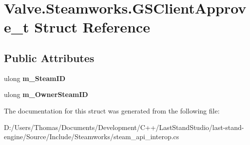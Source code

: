 \hypertarget{structValve_1_1Steamworks_1_1GSClientApprove__t}{}\section{Valve.\+Steamworks.\+G\+S\+Client\+Approve\+\_\+t Struct Reference}
\label{structValve_1_1Steamworks_1_1GSClientApprove__t}
\subsection*{Public Attributes}
\begin{DoxyCompactItemize}
\item 
\hypertarget{structValve_1_1Steamworks_1_1GSClientApprove__t_a069979c6ace4628d721bfbeddd993b1d}{}ulong {\bfseries m\+\_\+\+Steam\+I\+D}\label{structValve_1_1Steamworks_1_1GSClientApprove__t_a069979c6ace4628d721bfbeddd993b1d}

\item 
\hypertarget{structValve_1_1Steamworks_1_1GSClientApprove__t_a5cabb2a9993b7b525e0fb82eeac61716}{}ulong {\bfseries m\+\_\+\+Owner\+Steam\+I\+D}\label{structValve_1_1Steamworks_1_1GSClientApprove__t_a5cabb2a9993b7b525e0fb82eeac61716}

\end{DoxyCompactItemize}


The documentation for this struct was generated from the following file\+:\begin{DoxyCompactItemize}
\item 
D\+:/\+Users/\+Thomas/\+Documents/\+Development/\+C++/\+Last\+Stand\+Studio/last-\/stand-\/engine/\+Source/\+Include/\+Steamworks/steam\+\_\+api\+\_\+interop.\+cs\end{DoxyCompactItemize}

